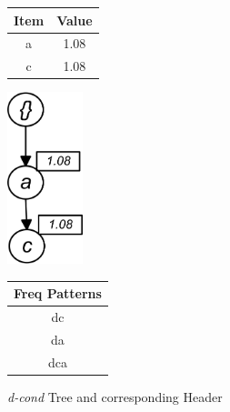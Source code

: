 %
\begin{figure}
\begin{minipage}{0.40\textwidth}
  \centering
	\begin{center}
	\begin{tabular}{ |c|c| } 
 	\hline
 		Item&Value\\ \hline\hline
 		a &  1.08  	\\ \hline
 		c &  1.08   	\\ \hline
 		
\end{tabular}
\end{center}  
\end{minipage}
  \hfill
\hfill
\begin{minipage}{0.23\textwidth}
  \centering
  \hfill
  \includegraphics[width=.8\textwidth, height=5cm]{images/D_COND.jpg}
  \hfill
\end{minipage}
\hfill
\begin{minipage}{0.30\textwidth}
  \centering
  
	\begin{center}
	\begin{tabular}{ |c| } 
 	\hline
 		Freq Patterns \\ \hline\hline
 		dc  	\\ \hline
 		da   	\\ \hline
 		dca   	\\ \hline
 		
\end{tabular}
\end{center}  
\end{minipage}
\caption{\emph{d-cond} Tree and corresponding Header}
\label{figure:d_cond}
\end{figure}

